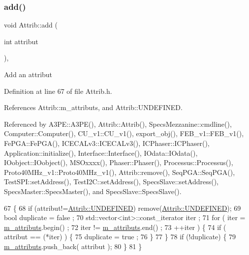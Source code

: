 \subsubsection{\texorpdfstring{add()}{add()}}
{\footnotesize\ttfamily void Attrib\+::add (\begin{DoxyParamCaption}\item[{int}]{attribut }\end{DoxyParamCaption})\hspace{0.3cm}{\ttfamily [inline]}, {\ttfamily [inherited]}}

Add an attribut 

Definition at line 67 of file Attrib.\+h.



References Attrib\+::m\+\_\+attributs, and Attrib\+::\+U\+N\+D\+E\+F\+I\+N\+ED.



Referenced by A3\+P\+E\+::\+A3\+P\+E(), Attrib\+::\+Attrib(), Specs\+Mezzanine\+::cmdline(), Computer\+::\+Computer(), C\+U\+\_\+v1\+::\+C\+U\+\_\+v1(), export\+\_\+obj(), F\+E\+B\+\_\+v1\+::\+F\+E\+B\+\_\+v1(), Fe\+P\+G\+A\+::\+Fe\+P\+G\+A(), I\+C\+E\+C\+A\+Lv3\+::\+I\+C\+E\+C\+A\+Lv3(), I\+C\+Phaser\+::\+I\+C\+Phaser(), Application\+::initialize(), Interface\+::\+Interface(), I\+Odata\+::\+I\+Odata(), I\+Oobject\+::\+I\+Oobject(), M\+S\+Oxxxx(), Phaser\+::\+Phaser(), Processus\+::\+Processus(), Proto40\+M\+Hz\+\_\+v1\+::\+Proto40\+M\+Hz\+\_\+v1(), Attrib\+::remove(), Seq\+P\+G\+A\+::\+Seq\+P\+G\+A(), Test\+S\+P\+I\+::set\+Address(), Test\+I2\+C\+::set\+Address(), Specs\+Slave\+::set\+Address(), Specs\+Master\+::\+Specs\+Master(), and Specs\+Slave\+::\+Specs\+Slave().


\begin{DoxyCode}
67                             \{
68     \textcolor{keywordflow}{if} (attribut!=\hyperlink{classAttrib_a69e171d7cc6417835a5a306d3c764235a3a8da2ab97dda18aebab196fe4100531}{Attrib::UNDEFINED}) \textcolor{keyword}{remove}(\hyperlink{classAttrib_a69e171d7cc6417835a5a306d3c764235a3a8da2ab97dda18aebab196fe4100531}{Attrib::UNDEFINED});
69     \textcolor{keywordtype}{bool} duplicate = false ;
70     std::vector<int>::const\_iterator iter ;
71     \textcolor{keywordflow}{for} ( iter  = \hyperlink{classAttrib_ac4bd58a0cc6b38a3b711d609a3d3aacc}{m\_attributs}.begin() ;
72           iter != \hyperlink{classAttrib_ac4bd58a0cc6b38a3b711d609a3d3aacc}{m\_attributs}.end()   ;
73           ++iter ) \{
74       \textcolor{keywordflow}{if} ( attribut == (*iter) ) \{
75         duplicate = true ;
76       \}
77     \}
78     \textcolor{keywordflow}{if} (!duplicate) \{
79       \hyperlink{classAttrib_ac4bd58a0cc6b38a3b711d609a3d3aacc}{m\_attributs}.push\_back( attribut );
80     \}
81   \}
\end{DoxyCode}
\mbox{\label{classHierarchy_ad677774ff38fcb257c04a3a10d471fac}} 
